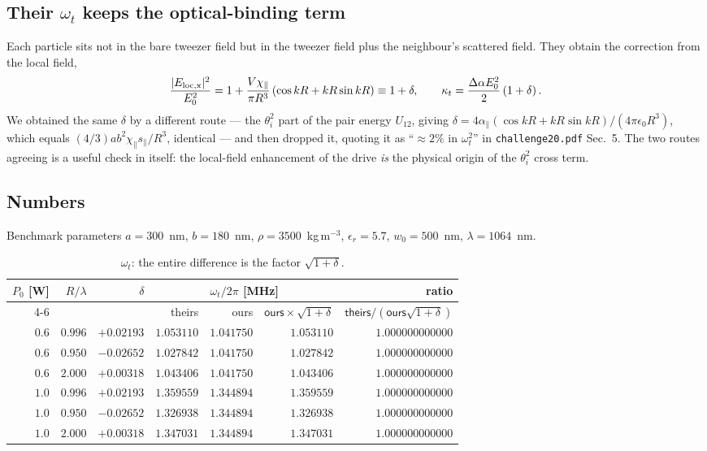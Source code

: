 \documentclass[11pt,a4paper]{article}
\newcommand{\dalpha}{\Delta\alpha}
\newcommand{\ours}{\textsf{ours}}
\newcommand{\theirs}{\textsf{theirs}}
\begin{document}
\subsection{Their $\omega_t$ keeps the optical-binding term}

Each particle sits not in the bare tweezer field but in the tweezer field plus
the neighbour's scattered field.  They obtain the correction from the local
field,
\begin{equation}
  \frac{|E_{\rm loc,x}|^{2}}{E_0^{2}}=1+\frac{V\chi_{\parallel}}{\pi R^{3}}
  \left(\cos kR+kR\sin kR\right)\equiv1+\delta,
  \qquad
  \kappa_t=\frac{\dalpha E_0^{2}}{2}\left(1+\delta\right).
\end{equation}
We obtained the same $\delta$ by a different route --- the $\theta_i^{2}$ part
of the pair energy $U_{12}$, giving
$\delta=4\alpha_{\parallel}(\cos kR+kR\sin kR)/(4\pi\epsilon_0R^{3})$, which
equals $(4/3)ab^{2}\chi_{\parallel}s_{\parallel}/R^{3}$, identical --- and then
dropped it, quoting it as ``${\approx}2\%$ in $\omega_t^{2}$'' in
\texttt{challenge20.pdf} Sec.~5.  The two routes agreeing is a useful check in
itself: the local-field enhancement of the drive \emph{is} the physical origin
of the $\theta_i^{2}$ cross term.

\subsection{Numbers}

Benchmark parameters $a=300$~nm, $b=180$~nm, $\rho=3500$~kg\,m$^{-3}$,
$\epsilon_r=5.7$, $w_0=500$~nm, $\lambda=1064$~nm.

\begin{table}[h]
\centering\small
\begin{tabular}{rrr rrr r}
\toprule
$P_0$ [W] & $R/\lambda$ & $\delta$
& \multicolumn{3}{c}{$\omega_t/2\pi$ [MHz]}
& ratio \\
\cmidrule(lr){4-6}
& & & \theirs & \ours & $\ours\times\sqrt{1+\delta}$
& $\theirs/(\ours\sqrt{1+\delta})$ \\
\midrule
$0.6$ & $0.996$ & $+0.02193$ & $1.053110$ & $1.041750$ & $1.053110$ & $1.000000000000$ \\
$0.6$ & $0.950$ & $-0.02652$ & $1.027842$ & $1.041750$ & $1.027842$ & $1.000000000000$ \\
$0.6$ & $2.000$ & $+0.00318$ & $1.043406$ & $1.041750$ & $1.043406$ & $1.000000000000$ \\
$1.0$ & $0.996$ & $+0.02193$ & $1.359559$ & $1.344894$ & $1.359559$ & $1.000000000000$ \\
$1.0$ & $0.950$ & $-0.02652$ & $1.326938$ & $1.344894$ & $1.326938$ & $1.000000000000$ \\
$1.0$ & $2.000$ & $+0.00318$ & $1.347031$ & $1.344894$ & $1.347031$ & $1.000000000000$ \\
\bottomrule
\end{tabular}
\caption{$\omega_t$: the entire difference is the factor $\sqrt{1+\delta}$.}
\end{table}
\end{document}
